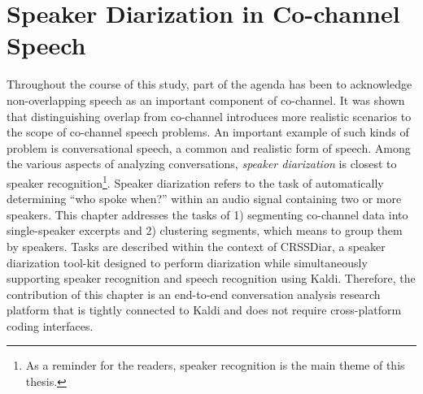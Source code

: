 
\chapter{Speaker Diarization in Co-channel Speech}
\label{chap:spkr_diar}

Throughout the course of this study, part of the agenda has been to acknowledge non-overlapping speech as an important component of co-channel. 
It was shown that distinguishing overlap from co-channel introduces more realistic scenarios to the scope of co-channel speech problems. 
An important example of such kinds of problem is conversational speech, a common and realistic form of speech. 
Among the various aspects of analyzing conversations, {\it speaker diarization} is closest to speaker recognition\footnote{As a reminder for the readers, speaker recognition is the main theme of this thesis.}.
Speaker diarization refers to the task of automatically determining ``who spoke when?'' within an audio signal containing two or more speakers. 
This chapter addresses the tasks of 1) segmenting co-channel data into single-speaker excerpts and 2) clustering segments, which means to group them by speakers. 
Tasks are described within the context of CRSSDiar, a speaker diarization tool-kit designed to perform diarization while simultaneously supporting speaker recognition and speech recognition using Kaldi\cite{kaldi}. 
Therefore, the contribution of this chapter is an end-to-end conversation analysis research platform that is tightly connected to Kaldi and does not require cross-platform coding interfaces. 

